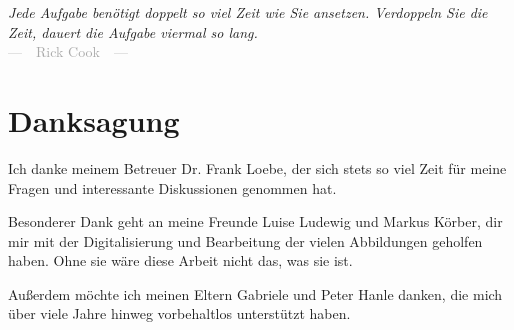 
\begin{flushright}{\slshape
    Jede Aufgabe benötigt doppelt so viel Zeit wie Sie ansetzen. Verdoppeln Sie die Zeit, dauert die Aufgabe viermal so lang. } \\ \medskip
    \textcolor{darkgray}{---~~Rick Cook~~---}
\end{flushright}



\bigskip

\begingroup
\let\clearpage\relax
\let\cleardoublepage\relax
\let\cleardoublepage\relax
\chapter*{Danksagung}

Ich danke meinem Betreuer Dr. Frank Loebe, der sich stets so viel Zeit für meine Fragen und interessante Diskussionen genommen hat.

Besonderer Dank geht an meine Freunde Luise Ludewig und Markus Körber, dir mir mit der Digitalisierung und Bearbeitung der vielen Abbildungen geholfen haben. Ohne sie wäre diese Arbeit nicht das, was sie ist.

Außerdem möchte ich meinen Eltern Gabriele und Peter Hanle danken, die mich über viele Jahre hinweg vorbehaltlos unterstützt haben.


\endgroup
